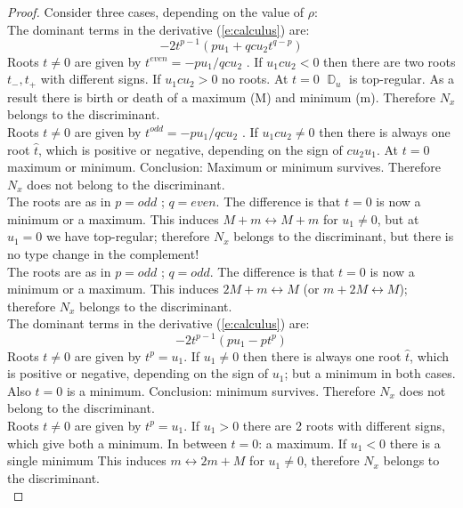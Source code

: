 \documentclass[12pt,a4,twoside]{amsart}
\DeclareMathOperator{\sq}{\mathbb{D}}
\newtheorem*{main lemma}{The main lemma}
\begin{document}
\begin{proof}
Consider three cases, depending on the value of $\rho$: \\
 The dominant terms in  the derivative (\ref{e:calculus})  are:
\begin{equation}
- 2 t^{p-1}  (p  u_1  + q c u_2 t ^{q-p} )
\end{equation}
 Roots $t \ne 0 $ are given by $t^{even} = - pu_1 /  qcu_2$ . If $u_1cu_2 < 0$ then there are two roots $t_{-}, t_{+}$ with different signs. If $u_1cu_2 >  0$  no roots. At $t=0$  $\sq_u$ is top-regular. As a result there is  birth or death of a maximum (M) and minimum (m). Therefore $N_x$ belongs to the discriminant.\\
  Roots $t \ne 0 $ are given by $t^{odd} = - pu_1 /  qcu_2$ . If $u_1cu_2 \ne  0$ then there is always one root $\hat{t}$, which is positive or negative, depending on the sign of $c u_2u_1$. At $t=0$  maximum or minimum. Conclusion: Maximum or minimum survives. Therefore $N_x$ does not belong to the discriminant.\\
 The roots are as in $p = odd$ ; $q = even$. The difference is that $t=0$ is now a minimum or a maximum. This induces $M+m \leftrightarrow M+m$ for $u_1 \ne 0$, but at $u_1=0$ we have top-regular; therefore $N_x$ belongs to the discriminant, but there is no type change in the complement!\\
 The roots are as in $p = odd$ ; $q = odd$. The difference is that $t=0$ is now a minimum or a maximum. This induces $2M+m \leftrightarrow M$ (or  $m+2M  \leftrightarrow M$); therefore $N_x$ belongs to the discriminant.\\
 The dominant terms in  the derivative (\ref{e:calculus})  are:
\begin{equation}
- 2 t^{p-1}  (p  u_1  - p t ^{p} )
\end{equation}
 Roots $t \ne 0 $ are given by $t^{p} = u_1$.
If $u_1\ne  0$ then there is always one root $\hat{t}$, which is positive or negative, depending on the sign of $u_1$; but a minimum in both cases. Also $t=0$ is a minimum. Conclusion: minimum survives. Therefore $N_x$ does not belong to the discriminant.\\
 Roots $t \ne 0 $ are given by $t^{p} = u_1$. If $u_1 > 0$ there are 2 roots with different signs, which give both a minimum. In between $t=0 $: a maximum. If $u_1 < 0$ there is a single minimum 
 This induces $m \leftrightarrow 2m+M$ for $u_1 \ne 0$, therefore $N_x$ belongs to the discriminant.\\

\end{proof}
\end{document}
